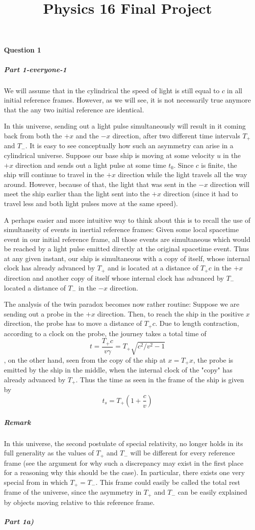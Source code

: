 \title{Physics 16 Final Project}
\newcommand{\f}{\frac} 
\newcommand{\om}{\omega}
\newcommand{\pdif}[2]{\f{\partial #1}{\partial #2}}
\newcommand{\dif}[2]{\f{d#1}{d#2}}

\paragraph{Question 1}
\subparagraph*{Part 1-everyone-1}
We will assume that in the cylindrical the speed of light is still equal to $c$ in all initial reference frames. However, as we will see, it is not necessarily true anymore that the any two initial reference are identical.  \par 
In this universe, sending out a light pulse simultaneously will result in it coming back from both the $+x$ and the $-x$ direction, after two different time intervals $T_+$ and $T_-$. It is easy to see conceptually how such an asymmetry can arise in a cylindrical universe. Suppose our base ship is moving at some velocity $u$ in the $+x$ direction and sends out a light pulse at some time $t_0$. Since $c$ is finite, the ship will continue to travel in the $+x$ direction while the light travels all the way around. However, because of that, the light that was sent in the $-x$ direction will meet the ship earlier than the light sent into the $+x$ direction (since it had to travel less and both light pulses move at the same speed). \par 
A perhaps easier and more intuitive way to think about this is to recall the use of simultaneity of events in inertial reference frames: Given some local spacetime event in our initial reference frame, all those events are simultaneous which would be reached by a light pulse emitted directly at the original spacetime event. Thus at any given instant, our ship is simultaneous with a copy of itself, whose internal clock has already advanced by $T_+$ and is located at a distance of $T_+c$ in the $+x$ direction and another copy of itself whose internal clock has advanced by $T_-$ located a distance of $T_-$ in the $-x$ direction. \par 
The analysis of the twin paradox becomes now rather routine: Suppose we are sending out a probe in the $+x$ direction. Then, to reach the ship in the positive $x$ direction, the probe has to move a distance of $T_+c$. Due to length contraction, according to a clock on the probe, the journey takes a total time of \[t=\frac{T_+c}{v\gamma} = T_+\sqrt{c^2/v^2-1}\], on the other hand, seen from the copy of the ship at $x=T_+x$, the probe is emitted by the ship in the middle, when the internal clock of the "copy" has already advanced by $T_+$. Thus the time as seen in the frame of the ship is given by
\[ t_s = T_+(1+\frac{c}{v}) \]
\subparagraph*{Remark}
In this universe, the second postulate of special relativity, no longer holds in its full generality as the values of $T_+$ and $T_-$ will be different for every reference frame (see the argument for why such a discrepancy may exist in the first place for a reasoning why this should be the case). In particular, there exists one very special from in which $T_+=T_-$. This frame could easily be called the total rest frame of the universe, since the asymmetry in $T_+$ and $T_-$ can be easily explained by objects moving relative to this reference frame.
\subparagraph*{Part 1a)}
